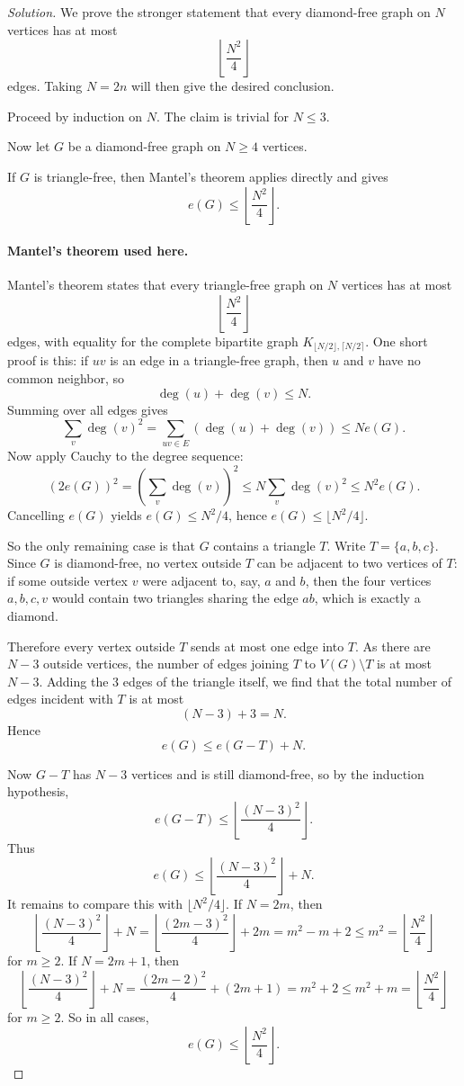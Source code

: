 \documentclass[11pt]{article}
\theoremstyle{definition}
\begin{document}
\begin{proof}[Solution]
We prove the stronger statement that every diamond-free graph on $N$ vertices has at most
\[
\left\lfloor \frac{N^2}{4}\right\rfloor
\]
edges. Taking $N=2n$ will then give the desired conclusion.

Proceed by induction on $N$. The claim is trivial for $N\le 3$.

Now let $G$ be a diamond-free graph on $N\ge 4$ vertices.

If $G$ is triangle-free, then Mantel's theorem applies directly and gives
\[
e(G)\le \left\lfloor \frac{N^2}{4}\right\rfloor.
\]

\paragraph{Mantel's theorem used here.}
Mantel's theorem states that every triangle-free graph on $N$ vertices has at most
\[
\left\lfloor \frac{N^2}{4}\right\rfloor
\]
edges, with equality for the complete bipartite graph $K_{\lfloor N/2\rfloor,\lceil N/2\rceil}$.
One short proof is this: if $uv$ is an edge in a triangle-free graph, then $u$ and $v$ have no common neighbor, so
\[
\deg(u)+\deg(v)\le N.
\]
Summing over all edges gives
\[
\sum_{v}\deg(v)^2 = \sum_{uv\in E} (\deg(u)+\deg(v)) \le N e(G).
\]
Now apply Cauchy to the degree sequence:
\[
(2e(G))^2 = \left(\sum_v \deg(v)\right)^2 \le N\sum_v \deg(v)^2 \le N^2 e(G).
\]
Cancelling $e(G)$ yields $e(G)\le N^2/4$, hence $e(G)\le \lfloor N^2/4\rfloor$.

So the only remaining case is that $G$ contains a triangle $T$. Write $T=\{a,b,c\}$. Since $G$ is diamond-free, no vertex outside $T$ can be adjacent to two vertices of $T$: if some outside vertex $v$ were adjacent to, say, $a$ and $b$, then the four vertices $a,b,c,v$ would contain two triangles sharing the edge $ab$, which is exactly a diamond.

Therefore every vertex outside $T$ sends at most one edge into $T$. As there are $N-3$ outside vertices, the number of edges joining $T$ to $V(G)\setminus T$ is at most $N-3$. Adding the $3$ edges of the triangle itself, we find that the total number of edges incident with $T$ is at most
\[
(N-3)+3=N.
\]
Hence
\[
e(G)\le e(G-T)+N.
\]

Now $G-T$ has $N-3$ vertices and is still diamond-free, so by the induction hypothesis,
\[
e(G-T)\le \left\lfloor \frac{(N-3)^2}{4}\right\rfloor.
\]
Thus
\[
e(G)\le \left\lfloor \frac{(N-3)^2}{4}\right\rfloor + N.
\]
It remains to compare this with $\lfloor N^2/4\rfloor$. If $N=2m$, then
\[
\left\lfloor \frac{(N-3)^2}{4}\right\rfloor + N
= \left\lfloor \frac{(2m-3)^2}{4}\right\rfloor + 2m
= m^2-m+2
\le m^2
= \left\lfloor \frac{N^2}{4}\right\rfloor
\]
for $m\ge 2$. If $N=2m+1$, then
\[
\left\lfloor \frac{(N-3)^2}{4}\right\rfloor + N
= \frac{(2m-2)^2}{4} + (2m+1)
= m^2+2
\le m^2+m
= \left\lfloor \frac{N^2}{4}\right\rfloor
\]
for $m\ge 2$. So in all cases,
\[
e(G)\le \left\lfloor \frac{N^2}{4}\right\rfloor.
\]


\end{proof}
\end{document}
